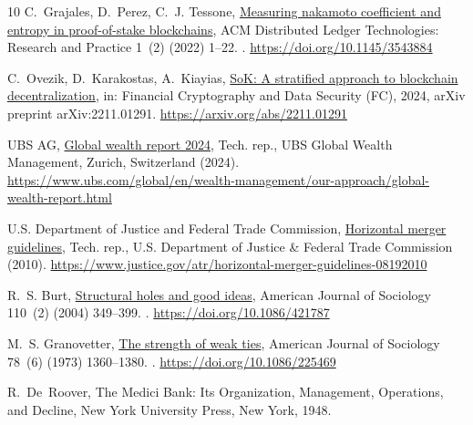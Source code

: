 \documentclass[final,5p,times]{elsarticle}
\begin{document}
\begin{thebibliography}{10}
C.~Grajales, D.~Perez, C.~J. Tessone, \href{https://doi.org/10.1145/3543884}{Measuring nakamoto coefficient and entropy in proof-of-stake blockchains}, ACM Distributed Ledger Technologies: Research and Practice 1~(2) (2022) 1--22.
\newblock \href {https://doi.org/10.1145/3543884} {}.
\newline\urlprefix\url{https://doi.org/10.1145/3543884}

C.~Ovezik, D.~Karakostas, A.~Kiayias, \href{https://arxiv.org/abs/2211.01291}{{SoK}: A stratified approach to blockchain decentralization}, in: Financial Cryptography and Data Security (FC), 2024, arXiv preprint arXiv:2211.01291.
\newline\urlprefix\url{https://arxiv.org/abs/2211.01291}

{UBS AG}, \href{https://www.ubs.com/global/en/wealth-management/our-approach/global-wealth-report.html}{Global wealth report 2024}, Tech. rep., UBS Global Wealth Management, Zurich, Switzerland (2024).
\newline\urlprefix\url{https://www.ubs.com/global/en/wealth-management/our-approach/global-wealth-report.html}

{U.S. Department of Justice and Federal Trade Commission}, \href{https://www.justice.gov/atr/horizontal-merger-guidelines-08192010}{Horizontal merger guidelines}, Tech. rep., U.S. Department of Justice \& Federal Trade Commission (2010).
\newline\urlprefix\url{https://www.justice.gov/atr/horizontal-merger-guidelines-08192010}

R.~S. Burt, \href{https://doi.org/10.1086/421787}{Structural holes and good ideas}, American Journal of Sociology 110~(2) (2004) 349--399.
\newblock \href {https://doi.org/10.1086/421787} {}.
\newline\urlprefix\url{https://doi.org/10.1086/421787}

M.~S. Granovetter, \href{https://doi.org/10.1086/225469}{The strength of weak ties}, American Journal of Sociology 78~(6) (1973) 1360--1380.
\newblock \href {https://doi.org/10.1086/225469} {}.
\newline\urlprefix\url{https://doi.org/10.1086/225469}

R.~De~Roover, The Medici Bank: Its Organization, Management, Operations, and Decline, New York University Press, New York, 1948.


\end{thebibliography}
\end{document}
